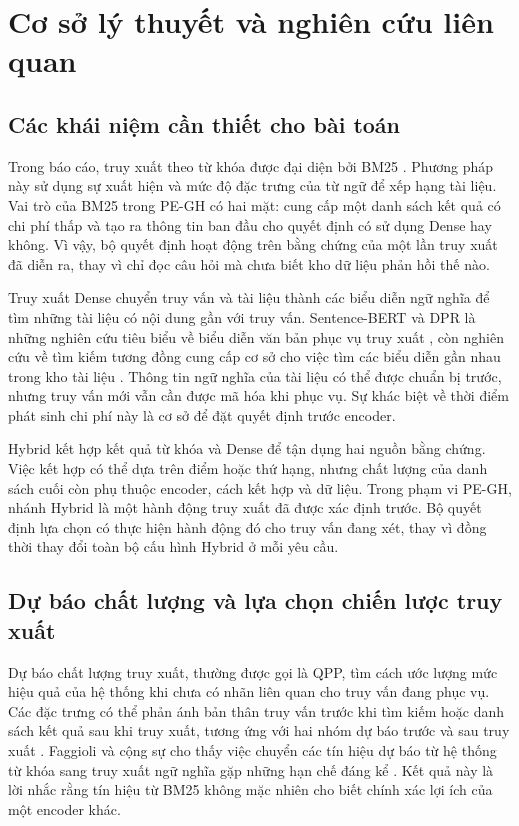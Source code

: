 \chapter{Cơ sở lý thuyết và nghiên cứu liên quan}
\label{chap:background}

\section{Các khái niệm cần thiết cho bài toán}
Trong báo cáo, truy xuất theo từ khóa được đại diện bởi BM25 \cite{bm25_2009}. Phương pháp này sử dụng sự xuất hiện và mức độ đặc trưng của từ ngữ để xếp hạng tài liệu. Vai trò của BM25 trong PE-GH có hai mặt: cung cấp một danh sách kết quả có chi phí thấp và tạo ra thông tin ban đầu cho quyết định có sử dụng Dense hay không. Vì vậy, bộ quyết định hoạt động trên bằng chứng của một lần truy xuất đã diễn ra, thay vì chỉ đọc câu hỏi mà chưa biết kho dữ liệu phản hồi thế nào.

Truy xuất Dense chuyển truy vấn và tài liệu thành các biểu diễn ngữ nghĩa để tìm những tài liệu có nội dung gần với truy vấn. Sentence-BERT và DPR là những nghiên cứu tiêu biểu về biểu diễn văn bản phục vụ truy xuất \cite{sbert2019,dpr2020}, còn nghiên cứu về tìm kiếm tương đồng cung cấp cơ sở cho việc tìm các biểu diễn gần nhau trong kho tài liệu \cite{faiss2021}. Thông tin ngữ nghĩa của tài liệu có thể được chuẩn bị trước, nhưng truy vấn mới vẫn cần được mã hóa khi phục vụ. Sự khác biệt về thời điểm phát sinh chi phí này là cơ sở để đặt quyết định trước encoder.

Hybrid kết hợp kết quả từ khóa và Dense để tận dụng hai nguồn bằng chứng. Việc kết hợp có thể dựa trên điểm hoặc thứ hạng, nhưng chất lượng của danh sách cuối còn phụ thuộc encoder, cách kết hợp và dữ liệu. Trong phạm vi PE-GH, nhánh Hybrid là một hành động truy xuất đã được xác định trước. Bộ quyết định lựa chọn có thực hiện hành động đó cho truy vấn đang xét, thay vì đồng thời thay đổi toàn bộ cấu hình Hybrid ở mỗi yêu cầu.

\section{Dự báo chất lượng và lựa chọn chiến lược truy xuất}
Dự báo chất lượng truy xuất, thường được gọi là QPP, tìm cách ước lượng mức hiệu quả của hệ thống khi chưa có nhãn liên quan cho truy vấn đang phục vụ. Các đặc trưng có thể phản ánh bản thân truy vấn trước khi tìm kiếm hoặc danh sách kết quả sau khi truy xuất, tương ứng với hai nhóm dự báo trước và sau truy xuất \cite{preqpp2008,clarity2002}. Faggioli và cộng sự cho thấy việc chuyển các tín hiệu dự báo từ hệ thống từ khóa sang truy xuất ngữ nghĩa gặp những hạn chế đáng kể \cite{qpp2023}. Kết quả này là lời nhắc rằng tín hiệu từ BM25 không mặc nhiên cho biết chính xác lợi ích của một encoder khác.

